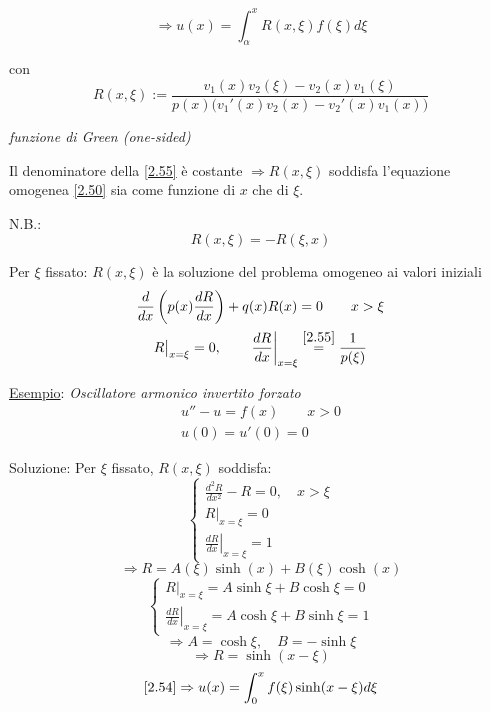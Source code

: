 \documentclass[a4paper,11pt]{report}
\begin{document}
\begin{equation}
\Rightarrow u(x)=\int_\alpha^xR(x,\xi)f(\xi)d\xi
\label{2.54}
\end{equation}

con 
\begin{equation}
R(x,\xi):=\frac{v_1(x)v_2(\xi)-v_2(x)v_1(\xi)}{p(x)\big(v_1'(x)v_2(x)-v_2'(x)v_1(x)\big)}
\label{2.55}
\end{equation}
\centerline{\emph{funzione di Green (one-sided)}}

\medskip

Il denominatore della \eqref{2.55} \`e costante $\Rightarrow R(x,\xi)$ soddisfa l'equazione omogenea \eqref{2.50} sia come funzione di $x$ che di $\xi$. 

N.B.:
\[
R(x,\xi)=-R(\xi,x)
\]

Per $\xi$ fissato: $R(x,\xi)$ \`e la soluzione del problema omogeneo ai valori iniziali
\begin{equation}
\begin{gathered}
\frac{d}{dx}\left(p(x)\frac{dR}{dx}\right) + q(x)R(x)=0 \qquad x>\xi \\
R \big|_{x=\xi}=0, \qquad \left.\frac{dR}{dx}\right|_{x=\xi}\overset{\eqref{2.55}}{=}\frac{1}{p(\xi)}
\end{gathered}
\label{2.56}
\end{equation}

\medskip

\underline{Esempio}: \emph{Oscillatore armonico invertito forzato}
\[
\begin{gathered}
u'' - u =f(x) \qquad x>0 \\
u(0)=u'(0)=0
\end{gathered}
\]

Soluzione: Per $\xi$ fissato, $R(x,\xi)$ soddisfa:
\[
\begin{cases}
\frac{d^2R}{dx^2}-R=0, \quad x>\xi \\
R|_{x=\xi}=0\\
\left.\frac{dR}{dx}\right|_{x=\xi}=1
\end{cases}
\]
\[
\Rightarrow R= A(\xi)\sinh(x)+B(\xi)\cosh(x)
\]
\[
\begin{cases}
R|_{x=\xi}=A\sinh\xi + B \cosh \xi =0\\
\left.\frac{dR}{dx}\right|_{x=\xi}=A\cosh\xi + B \sinh \xi =1
\end{cases}
\]
\[
\Rightarrow A=\cosh \xi, \quad B=-\sinh \xi
\]
\[
 \Rightarrow R=\sinh(x-\xi)
\]
\[
\eqref{2.54}\Rightarrow u(x)=\int_0^x f(\xi)\sinh(x-\xi)d\xi
\]
\end{document}
